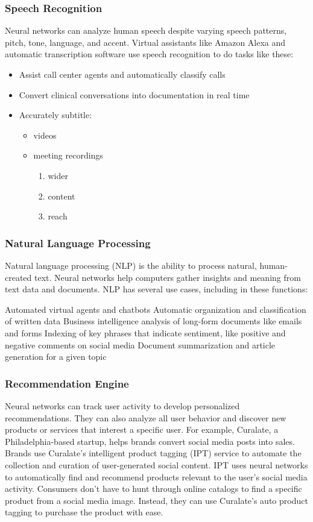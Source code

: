 \documentclass[titlepage, 12pt]{article}
\begin{document}
			\subsubsection {Speech Recognition}
			Neural networks can analyze human speech despite varying speech patterns, pitch, tone, language, and accent. Virtual assistants like Amazon Alexa and automatic transcription software use speech recognition to do tasks like these:
			\begin{itemize}
				\item Assist call center agents and automatically classify calls
				\item Convert clinical conversations into documentation in real time
				\item Accurately subtitle:
				\begin{itemize}
					\item videos
					\item meeting recordings
					\begin{enumerate}
						\item wider
						\item content
						\item reach
					\end{enumerate}
				\end{itemize}
			\end{itemize}
			
			\subsubsection{Natural Language Processing}
			Natural language processing (NLP) is the ability to process natural, human-created text. Neural networks help computers gather insights and meaning from text data and documents. NLP has several use cases, including in these functions:
			
			Automated virtual agents and chatbots
			Automatic organization and classification of written data
			Business intelligence analysis of long-form documents like emails and forms
			Indexing of key phrases that indicate sentiment, like positive and negative comments on social media
			Document summarization and article generation for a given topic
			\subsubsection{Recommendation Engine}
			Neural networks can track user activity to develop personalized recommendations. They can also analyze all user behavior and discover new products or services that interest a specific user. For example, Curalate, a Philadelphia-based startup, helps brands convert social media posts into sales. Brands use Curalate’s intelligent product tagging (IPT) service to automate the collection and curation of user-generated social content. IPT uses neural networks to automatically find and recommend products relevant to the user’s social media activity. Consumers don't have to hunt through online catalogs to find a specific product from a social media image. Instead, they can use Curalate’s auto product tagging to purchase the product with ease.
\end{document}
